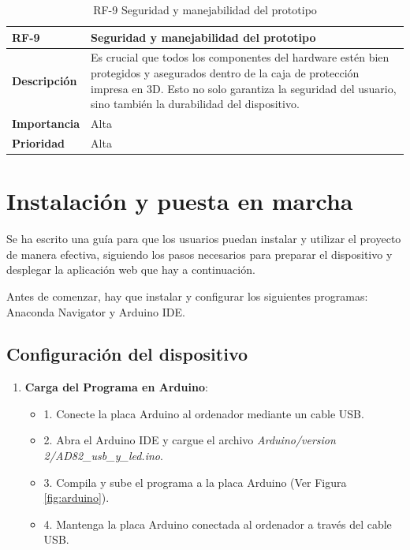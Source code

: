 \begin{table}[p]
    \centering
    \begin{tabularx}{\linewidth}{ p{} p{} }
        \toprule
        \textbf{RF-9}    & \textbf{Seguridad y manejabilidad del prototipo} \\
        \toprule
        \textbf{Descripción}              & Es crucial que todos los componentes del hardware estén bien protegidos y asegurados dentro de la caja de protección impresa en 3D. Esto no solo garantiza la seguridad del usuario, sino también la durabilidad del dispositivo.   \\
        \textbf{Importancia}                & Alta \\
        \textbf{Prioridad}                & Alta \\
        \bottomrule
    \end{tabularx}
    \caption{RF-9 Seguridad y manejabilidad del prototipo}
    \label{RF-09}
\end{table}


\section{Instalación y puesta en marcha}

Se ha escrito una guía para que los usuarios puedan instalar y utilizar el proyecto de manera efectiva, siguiendo los pasos necesarios para preparar el dispositivo y desplegar la aplicación web que hay a continuación.

Antes de comenzar, hay que instalar y configurar los siguientes programas: Anaconda Navigator y Arduino IDE.

\subsection{Configuración del dispositivo}
\begin{enumerate}
    \item \textbf{Carga del Programa en Arduino}:
    \begin{itemize}
        \item 1. Conecte la placa Arduino al ordenador mediante un cable USB.
        \item 2. Abra el Arduino IDE y cargue el archivo \textit{Arduino/version 2/AD82\_usb\_y\_led.ino}.
        \item 3. Compila y sube el programa a la placa Arduino (Ver Figura \ref{fig:arduino}).
        \item 4. Mantenga la placa Arduino conectada al ordenador a través del cable USB.
    \end{itemize}
\end{enumerate}

